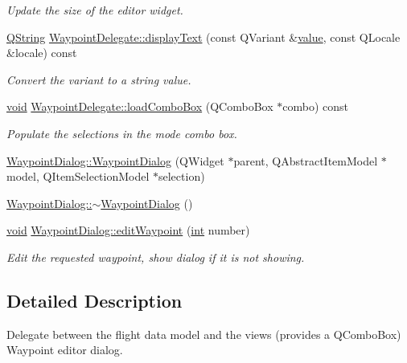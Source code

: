 \begin{DoxyCompactItemize}
\begin{DoxyCompactList}\small\item\em Update the size of the editor widget. \end{DoxyCompactList}\item 
\hyperlink{group___u_a_v_objects_plugin_gab9d252f49c333c94a72f97ce3105a32d}{Q\-String} \hyperlink{group___path_planner_ga14243b35579b422c1343085132072746}{Waypoint\-Delegate\-::display\-Text} (const Q\-Variant \&\hyperlink{glext_8h_aa0e2e9cea7f208d28acda0480144beb0}{value}, const Q\-Locale \&locale) const 
\begin{DoxyCompactList}\small\item\em Convert the variant to a string value. \end{DoxyCompactList}\item 
\hyperlink{group___u_a_v_objects_plugin_ga444cf2ff3f0ecbe028adce838d373f5c}{void} \hyperlink{group___path_planner_ga2ea240fcdff4626ac277f5160f67f2e6}{Waypoint\-Delegate\-::load\-Combo\-Box} (Q\-Combo\-Box $\ast$combo) const 
\begin{DoxyCompactList}\small\item\em Populate the selections in the mode combo box. \end{DoxyCompactList}\item 
\hyperlink{group___path_planner_ga79559741b9fcf0a36768f7df92746760}{Waypoint\-Dialog\-::\-Waypoint\-Dialog} (Q\-Widget $\ast$parent, Q\-Abstract\-Item\-Model $\ast$model, Q\-Item\-Selection\-Model $\ast$selection)
\item 
\hyperlink{group___path_planner_ga54d6efacbe7553519262195483f76ed5}{Waypoint\-Dialog\-::$\sim$\-Waypoint\-Dialog} ()
\item 
\hyperlink{group___u_a_v_objects_plugin_ga444cf2ff3f0ecbe028adce838d373f5c}{void} \hyperlink{group___path_planner_ga903050cdff8176aeedca31eae8b7ea02}{Waypoint\-Dialog\-::edit\-Waypoint} (\hyperlink{ioapi_8h_a787fa3cf048117ba7123753c1e74fcd6}{int} number)
\begin{DoxyCompactList}\small\item\em Edit the requested waypoint, show dialog if it is not showing. \end{DoxyCompactList}\end{DoxyCompactItemize}


\subsection{Detailed Description}
Delegate between the flight data model and the views (provides a Q\-Combo\-Box) Waypoint editor dialog.


